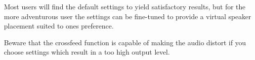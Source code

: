 {  Most users will find the default settings to yield satisfactory results, but
  for the more adventurous user the settings can be fine-tuned to provide a
  virtual speaker placement suited to ones preference.

  Beware that the crossfeed function is capable of making the audio distort
  if you choose settings which result in a too high output level.
}
  
